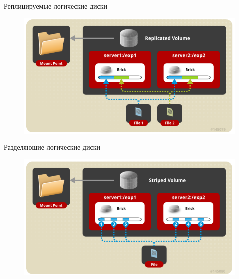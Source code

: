 \documentclass[sans]{beamer}
\begin{document}
\begin{frame}{Реплицируемые логические диски}
	\begin{figure}[h]
		\centering
		\includegraphics[width=0.8\linewidth]{images/replicated.png}
	\end{figure}
\end{frame}

\begin{frame}{Разделяющие логические диски}
	\begin{figure}[h]
		\centering
		\includegraphics[width=0.8\linewidth]{images/striped.png}
	\end{figure}
\end{frame}
\end{document}
